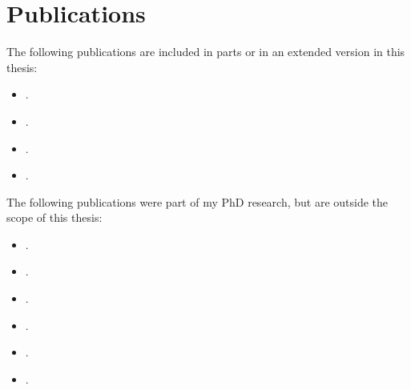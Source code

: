 \chapter*{Publications}

The following publications are included in parts or in an extended version in
this thesis:
\begin{itemize}
    \item {}.
    \item {}.
    \item {}.
    \item {}.
\end{itemize}

The following publications were part of my PhD research, but are outside the scope of this thesis:
\begin{itemize}
    \item {}.
    \item {}.
    \item {}.
    \item {}.
    \item {}.
    \item {}.
\end{itemize}

